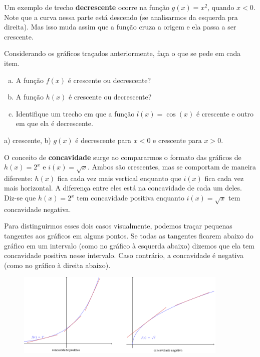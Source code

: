\documentclass[main.tex]{subfiles}
\begin{document}
Um exemplo de trecho \textbf{decrescente} ocorre na função $g(x)=x^2$,  quando $x<0$. Note que a curva nessa parte está descendo (se analisarmos da esquerda pra direita). Mas isso muda assim que a função cruza a origem e ela passa a ser crescente.

\begin{questao}
Considerando os gráficos traçados anteriormente, faça o que se pede em cada item.
\begin{enumerate}[a)]
\item A função $f(x)$ é crescente ou decrescente?
\item A função $h(x)$ é crescente ou decrescente?
\item Identifique um trecho em que a função $l(x)=\cos(x)$ é crescente e outro em que ela é decrescente.
\end{enumerate}
\end{questao}


\begin{gabarito}
	\begin{gabaritoQuestao}
		a) crescente, b) $g(x)$ é decrescente para $x<0$ e crescente para $x>0$.
	\end{gabaritoQuestao}
\end{gabarito}

O conceito de \textbf{concavidade} surge ao compararmos o formato das gráficos de $h(x)=2^x$ e $i(x)=\sqrt{x}$. Ambos são crescentes, mas se comportam de maneira diferente: $h(x)$ fica cada vez mais vertical enquanto que $i(x)$ fica cada vez mais horizontal. A diferença entre eles está na concavidade de cada um deles. Diz-se que $h(x)=2^x$ tem concavidade positiva enquanto $i(x)=\sqrt{x}$ tem concavidade negativa.

Para distinguirmos esses dois casos visualmente, podemos traçar pequenas tangentes aos gráficos em alguns pontos. Se todas as tangentes ficarem abaixo do gráfico em um intervalo (como no gráfico à esquerda abaixo) dizemos que ela tem concavidade positiva nesse intervalo. Caso contrário, a concavidade é negativa (como no gráfico à direita abaixo).

\begin{figure}[h]
\centering
\includegraphics[width=0.9\textwidth]{./img/c7q2.png}
\end{figure}
\end{document}

